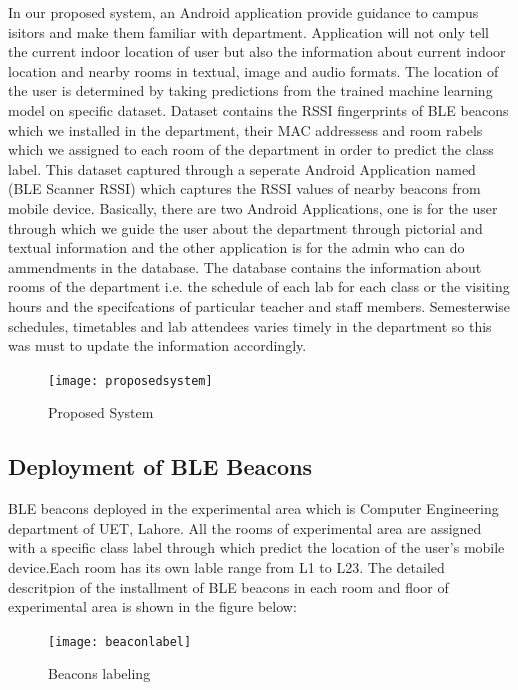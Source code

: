 In our proposed system, an Android application provide guidance to campus isitors and make them familiar with department. Application will not only tell the current indoor location of user but also the information about current indoor location and nearby rooms in textual, image and audio formats. The location of the user is determined by taking predictions from the trained machine learning model on specific dataset. Dataset contains the RSSI fingerprints of BLE beacons  which we installed in the department, their MAC addressess and room rabels which we assigned to each room of the department in order to predict the class label. This dataset captured through a seperate Android Application named (BLE Scanner RSSI) which captures the RSSI values of nearby beacons from mobile device. 
Basically, there are two Android Applications, one is for the user through which we guide the user about the department through pictorial and textual information and the other application is for the admin who can do ammendments in the database. The database contains the information about rooms of the department i.e. the schedule of each lab for each class or the visiting hours and the specifcations of particular teacher and staff members. Semesterwise schedules, timetables and lab attendees varies timely in the department so this was must to update the information accordingly.
\\

\begin{figure}[h]
\begin{center}
\texttt{[image: proposedsystem]}
\caption{Proposed System}
\label{fig:21}
\end{center}
\end{figure}

\clearpage
 \subsection{Deployment of BLE Beacons}
BLE beacons deployed in the experimental area which is Computer Engineering department of UET, Lahore. All the rooms of experimental area are assigned with a specific class label through which predict the location of the user's mobile device.Each room has its own lable range from L1 to L23. The detailed descritpion of the installment of BLE beacons in each room and floor of experimental area is shown in the figure below:

\begin{figure}[h]
\begin{center}
\texttt{[image: beaconlabel]}
\caption{Beacons labeling}
\label{fig:22}
\end{center}
\end{figure}

